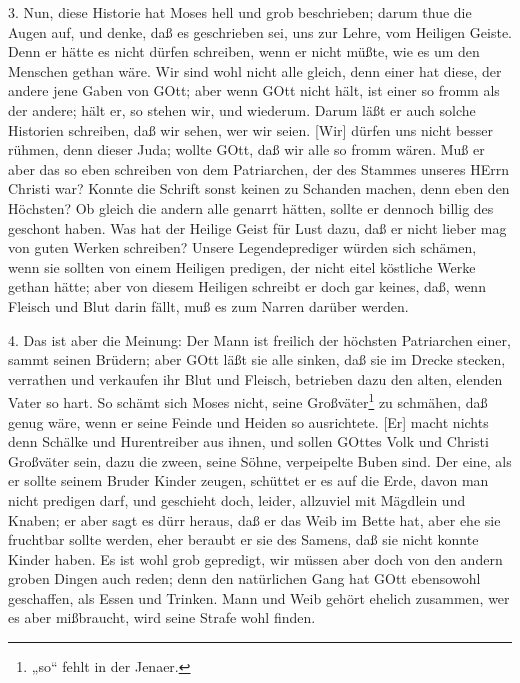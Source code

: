 3. Nun, diese Historie hat Moses hell und grob beschrieben; darum thue die Augen auf, und denke, daß es geschrieben sei, uns zur Lehre, vom Heiligen Geiste. Denn er hätte es nicht dürfen schreiben, wenn er nicht müßte, wie es um den Menschen gethan wäre. Wir sind wohl nicht alle gleich, denn einer hat diese, der andere jene Gaben von GOtt; aber wenn GOtt nicht hält, ist einer so fromm als der andere; hält er, so stehen wir, und wiederum. Darum läßt er auch solche Historien schreiben, daß wir sehen, wer wir seien. [Wir] dürfen uns nicht besser rühmen, denn dieser Juda; wollte GOtt, daß wir alle so fromm wären. Muß er aber das so eben schreiben von dem Patriarchen, der des Stammes unseres HErrn Christi war? Konnte die Schrift sonst keinen zu Schanden machen, denn eben den Höchsten? Ob gleich die andern alle genarrt hätten, sollte er dennoch billig des geschont haben. Was hat der Heilige Geist für Lust dazu, daß er nicht lieber mag von guten Werken schreiben? Unsere Legendeprediger würden sich schämen, wenn sie sollten von einem Heiligen predigen, der nicht eitel köstliche Werke gethan hätte; aber von diesem Heiligen schreibt er doch gar keines, daß, wenn Fleisch und Blut darin fällt, muß es zum Narren darüber werden.

4. Das ist aber die Meinung: Der Mann ist freilich der höchsten Patriarchen einer, sammt seinen Brüdern; aber GOtt läßt sie alle sinken, daß sie im Drecke stecken, verrathen und verkaufen ihr Blut und Fleisch, betrieben dazu den alten, elenden Vater so hart. So schämt sich Moses nicht, seine Großväter\footnote{„so“ fehlt in der Jenaer.} zu schmähen, daß genug wäre, wenn er seine Feinde und Heiden so ausrichtete. [Er] macht nichts denn Schälke und Hurentreiber aus ihnen, und sollen GOttes Volk und Christi Großväter sein, dazu die zween, seine Söhne, verpeipelte Buben sind. Der eine, als er sollte seinem Bruder Kinder zeugen, schüttet er es auf die Erde, davon man nicht predigen darf, und geschieht doch, leider, allzuviel mit Mägdlein und Knaben; er aber sagt es dürr heraus, daß er das Weib im Bette hat, aber ehe sie fruchtbar sollte werden, eher beraubt er sie des Samens, daß sie nicht konnte Kinder haben. Es ist wohl grob gepredigt, wir müssen aber doch von den andern groben Dingen auch reden; denn den natürlichen Gang hat GOtt ebensowohl geschaffen, als Essen und Trinken. Mann und Weib gehört ehelich zusammen, wer es aber mißbraucht, wird seine Strafe wohl finden.

